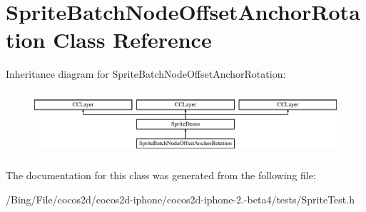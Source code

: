 \hypertarget{interface_sprite_batch_node_offset_anchor_rotation}{\section{Sprite\-Batch\-Node\-Offset\-Anchor\-Rotation Class Reference}
\label{interface_sprite_batch_node_offset_anchor_rotation}
}
Inheritance diagram for Sprite\-Batch\-Node\-Offset\-Anchor\-Rotation\-:\begin{figure}[H]
\begin{center}
\leavevmode
\includegraphics[height=2.372881cm]{interface_sprite_batch_node_offset_anchor_rotation}
\end{center}
\end{figure}


The documentation for this class was generated from the following file\-:\begin{DoxyCompactItemize}
\item 
/\-Bing/\-File/cocos2d/cocos2d-\/iphone/cocos2d-\/iphone-\/2.-\/beta4/tests/Sprite\-Test.\-h\end{DoxyCompactItemize}
